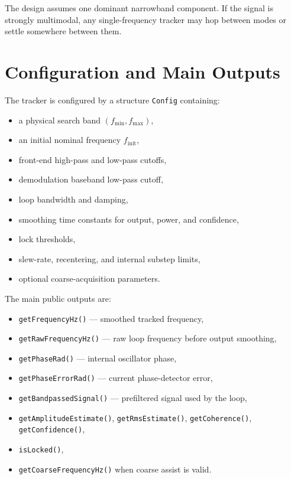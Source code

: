 \documentclass[conference]{IEEEtran}
\begin{document}
The design assumes one dominant narrowband component. If the signal is
strongly multimodal, any single-frequency tracker may hop between modes or
settle somewhere between them.

\section{Configuration and Main Outputs}

The tracker is configured by a structure \texttt{Config} containing:
\begin{itemize}[leftmargin=1.4em]
  \item a physical search band \((f_{\min}, f_{\max})\),
  \item an initial nominal frequency \(f_{\mathrm{init}}\),
  \item front-end high-pass and low-pass cutoffs,
  \item demodulation baseband low-pass cutoff,
  \item loop bandwidth and damping,
  \item smoothing time constants for output, power, and confidence,
  \item lock thresholds,
  \item slew-rate, recentering, and internal substep limits,
  \item optional coarse-acquisition parameters.
\end{itemize}

The main public outputs are:
\begin{itemize}[leftmargin=1.4em]
  \item \texttt{getFrequencyHz()} --- smoothed tracked frequency,
  \item \texttt{getRawFrequencyHz()} --- raw loop frequency before output smoothing,
  \item \texttt{getPhaseRad()} --- internal oscillator phase,
  \item \texttt{getPhaseErrorRad()} --- current phase-detector error,
  \item \texttt{getBandpassedSignal()} --- prefiltered signal used by the loop,
  \item \texttt{getAmplitudeEstimate()}, \texttt{getRmsEstimate()},
        \texttt{getCoherence()}, \texttt{getConfidence()},
  \item \texttt{isLocked()},
  \item \texttt{getCoarseFrequencyHz()} when coarse assist is valid.
\end{itemize}
\end{document}
